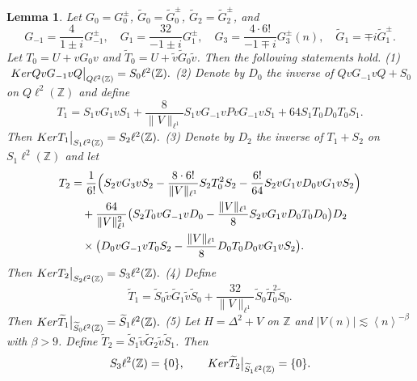\documentclass[10pt,a4paper]{amsart}
\newtheorem{lemma}[definition]{Lemma}
\newcommand\Z{\mathbb{Z}}
\numberwithin{equation}{section}
\begin{document}
\setcounter{section}{5}
\setcounter{equation}{12}
\setcounter{definition}{1}
\begin{lemma}\label{lemma of kernel and operaor}
Let $G_0=G^{\pm}_0$,  $\widetilde{G}_0=\widetilde{G}^{\pm}_0$, $\widetilde{G}_2=\widetilde{G}^{\pm}_2$, and $$G_{-1}=\frac{4}{1\pm i}G^{\pm}_{-1},\quad G_{1}=\frac{32}{-1\pm i}G^{\pm}_{1},\quad G_3=\frac{4\cdot6!}{-1\mp i}G^{\pm}_{3}(n),\quad \widetilde{G}_1=\mp i\widetilde{G}^{\pm}_1.$$
 Let $T_0=U+vG_0v$ and $\widetilde{T}_0=U+\tilde{v}\widetilde{G}_0\tilde{v}$. Then the following statements hold.
\vskip0.1cm
{\rm(1)}$~
{\rm Ker}QvG_{-1}vQ\big|_{Q\ell^2(\Z)}=S_0\ell^2(\Z).$
\vskip0.2cm
{\rm(2)} Denote by $D_0$ the inverse of $QvG_{-1}vQ+S_0$ on $Q\ell^2(\Z)$ and define
 \begin{equation}\label{T1}
T_1=S_1vG_1vS_1+\frac{8}{\|V\|_{\ell^1}}S_1vG_{-1}vPvG_{-1}vS_1+64S_1T_0D_0T_0S_1.
\end{equation}
Then
${\rm Ker}T_1\big|_{S_1\ell^2(\Z)}=S_2\ell^2(\Z).$
\vskip0.2cm
{\rm(3)} Denote by $D_2$ the inverse of $T_1+S_2$ on $S_1\ell^2(\Z)$ and let
\begin{align}\label{T2}
T_2&=\frac{1}{6!}\Big(S_2vG_3vS_2-\frac{8\cdot6!}{\|V\|_{\ell^1}}S_2T^2_0S_2-\frac{6!}{64}S_2vG_1vD_0vG_1vS_2\Big)\notag\\
&\quad+\frac{64}{\|V\|^2_{\ell^1}}\big(S_2T_0vG_{-1}vD_0-\frac{\|V\|_{\ell^1}}{8}S_2vG_1vD_0T_0D_0\big)D_2\\
&\quad\times \big(D_0vG_{-1}vT_0S_2-\frac{\|V\|_{\ell^1}}{8}D_0T_0D_0vG_1vS_2\big).\notag
\end{align}
Then
${\rm Ker}T_2\big|_{S_2\ell^2(\Z)}=S_3\ell^2(\Z).$
\vskip0.2cm
{\rm(4)} Define
\begin{equation}\label{T1tuta}
\widetilde{T}_1=\widetilde{S}_0\tilde{v}\widetilde{G}_1\tilde{v}\widetilde{S}_0+\frac{32}{\|V\|_{\ell^1}}\widetilde{S}_0\widetilde{T}^2_0\widetilde{S}_0.
\end{equation}
Then
${\rm Ker}\widetilde{T}_1\big|_{\widetilde{S}_0\ell^2(\Z)}=\widetilde{S}_1\ell^2(\Z).$
\vskip0.2cm
{\rm(5)} Let $H=\Delta^2+V$ on $\Z$ and $|V(n)|\lesssim\left<n\right>^{-\beta}$ with $\beta>9$. Define $\widetilde{T}_2=\widetilde{S}_1\tilde{v}\widetilde{G}_2\tilde{v}\widetilde{S}_1$. Then
$$S_3\ell^2(\Z)=\{0\},\qquad{\rm Ker}\widetilde{T}_2\big|_{\widetilde{S}_1\ell^2(\Z)}=\{0\}.$$
\end{lemma}
\end{document}
